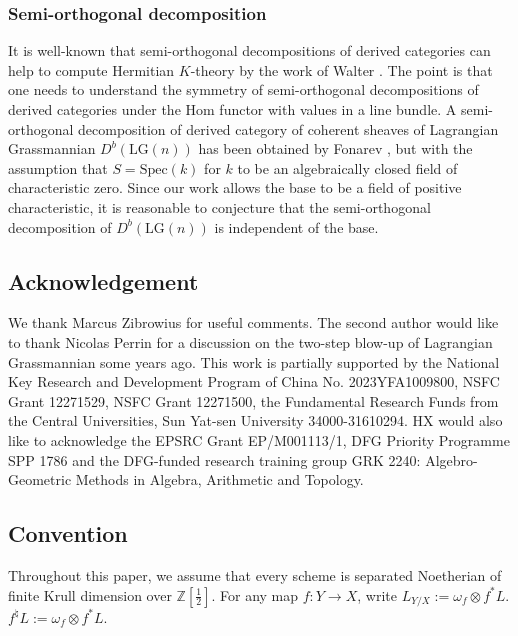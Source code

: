 \documentclass[a4paper]{amsart}
\theoremstyle{plain}
\theoremstyle{definition}
\numberwithin{equation}{section}
\newcommand{\LG}{\mathrm{LG}}
\begin{document}
\subsubsection{Semi-orthogonal decomposition} It is well-known that semi-orthogonal decompositions of derived categories can help to compute Hermitian $K$-theory by the work of Walter \cite{walter2003triangulated}. The point is that one needs to understand the symmetry of semi-orthogonal decompositions of derived categories under the Hom functor with values in a line bundle. A semi-orthogonal decomposition of derived category of coherent sheaves of Lagrangian Grassmannian $D^b(\LG(n))$ has been obtained by Fonarev \cite{fonarev2022full}, but with the assumption that $S=\mathrm{Spec}(k)$ for $k$ to be an algebraically closed field of characteristic zero. Since our work allows the base to be a field of positive characteristic, it is reasonable to conjecture that the semi-orthogonal decomposition of $D^b(\LG(n))$ is independent of the base.

\subsection*{Acknowledgement}
We thank Marcus Zibrowius for useful comments. The second author would like to thank Nicolas Perrin for a discussion on the two-step blow-up of Lagrangian Grassmannian some years ago. This work is partially supported by the National Key Research and Development Program of China No. 2023YFA1009800, NSFC Grant 12271529, NSFC Grant 12271500, the Fundamental Research Funds from the Central Universities, Sun Yat-sen University 34000-31610294. HX would also  like to acknowledge the EPSRC Grant EP/M001113/1, DFG Priority Programme SPP 1786 and the DFG-funded research training group GRK 2240: Algebro-Geometric Methods in Algebra, Arithmetic and Topology.

\subsection*{Convention}
Throughout this paper, we assume that every scheme is separated Noetherian of finite Krull dimension over $\mathbb{Z}[{\frac{1}{2}}]$.
For any map $f:Y \to X$, write $L_{Y/X}:=\omega_{f} \otimes f^{\ast} L$. $f^{\natural}L:=\omega_{f} \otimes f^{\ast} L$.

\end{document}
